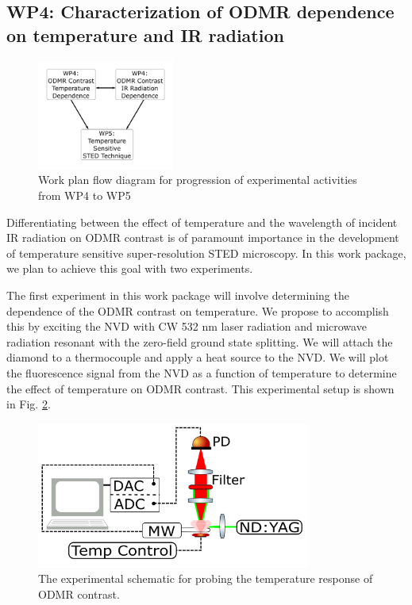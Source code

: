 \subsection{WP4: Characterization of ODMR dependence on temperature and IR radiation}

\begin{figure}
\centering
\includegraphics[width=0.4\textwidth]{Figures/WP45FlowChart.png}
\caption{Work plan flow diagram for progression of experimental activities from WP4 to WP5}
\label{WP45FlowChart}
\end{figure}

Differentiating between the effect of temperature and the wavelength of incident IR radiation on ODMR contrast 
is of paramount importance in the development of temperature sensitive super-resolution STED microscopy.  In 
this work package, we plan to achieve this goal with two experiments. 

The first experiment in this work package will involve determining the dependence of the ODMR contrast on
temperature. We propose to accomplish this by exciting the NVD with CW 532 nm laser radiation and microwave
radiation resonant with the zero-field ground state splitting.  We will attach the diamond to a thermocouple and
apply a heat source to the NVD.  We will plot the fluorescence signal from the NVD as a function of temperature
to determine the effect of temperature on ODMR contrast. This experimental setup is shown in Fig. 
\ref{WP4TempSchematic}.

\begin{figure}
\centering
\includegraphics[width=0.8\textwidth]{Figures/WP4TempSchematic.png}
\caption{The experimental schematic for probing the temperature response of ODMR contrast.}
\label{WP4TempSchematic}
\end{figure}

